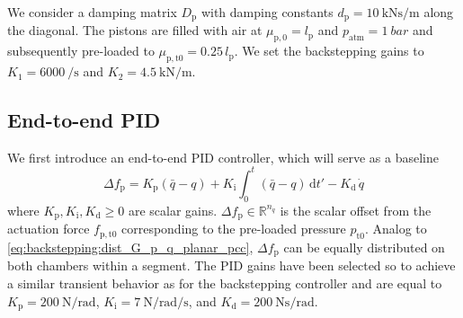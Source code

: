 We consider a damping matrix $D_\mathrm{p}$ with damping constants $d_\mathrm{p} = \SI{10}{\kilo \newton \second \per \meter}$ along the diagonal. The pistons are filled with air at $\mu_{\mathrm{p}, 0} = l_\mathrm{p}$ and $p_\mathrm{atm} = \SI{1}{bar}$ and subsequently pre-loaded to $\mu_{\mathrm{p}, \mathrm{t}0} = 0.25 \, l_\mathrm{p}$. %
We set the backstepping gains to $K_1 = \SI{6000}{\per \second}$ and $K_2 = \SI{4.5}{\kilo \newton \per \meter}$.

\subsection{End-to-end PID}
We first introduce an end-to-end PID controller, which will serve as a baseline
%
\begin{equation}
    \Delta f_\mathrm{p} = K_\mathrm{p} (\bar{q}-q) + K_\mathrm{i} \int_0^t (\bar{q}-q) \, \mathrm{d}t' - K_\mathrm{d} \, \dot{q}
\end{equation}
%
where $K_\mathrm{p},K_\mathrm{i},K_\mathrm{d} \geq 0$ are scalar gains. $\Delta f_\mathrm{p} \in \mathbb{R}^{n_q}$ is the scalar offset from the actuation force $f_{\mathrm{p},\mathrm{t}0}$ corresponding to the pre-loaded pressure $p_{\mathrm{t}0}$.
%
Analog to \eqref{eq:backstepping:dist_G_p_q_planar_pcc}, $\Delta f_\mathrm{p}$ can be equally distributed on both chambers within a segment.
The PID gains have been selected so to achieve a similar transient behavior as for the backstepping controller %
and are equal to $K_\mathrm{p} = \SI{200}{\newton \per \radian}$, $K_\mathrm{i} = \SI{7}{\newton \per \radian \per \second}$, and $K_\mathrm{d} = \SI{200}{\newton \second \per \radian}$. 

